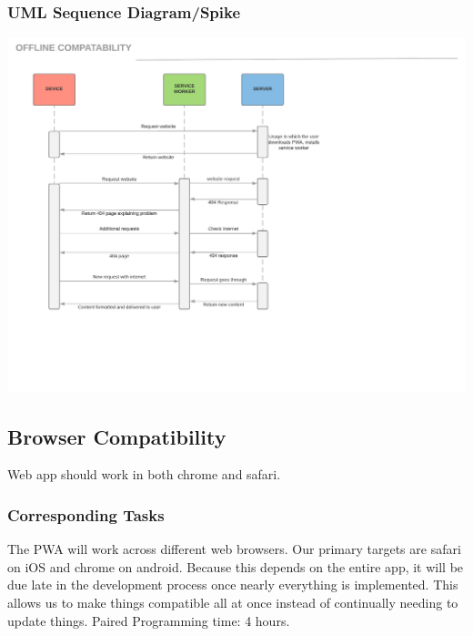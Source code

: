 \documentclass[12pt]{article}
\begin{document}
\subsubsection{UML Sequence Diagram/Spike}
\includegraphics[scale=0.5]{img/10.png}\linebreak

\subsection{Browser Compatibility}
Web app should work in both chrome and safari.
\subsubsection{Corresponding Tasks}
	The PWA will work across different web browsers.  Our primary targets are safari on iOS and chrome on android.  Because this depends on the entire app, it will be due late in the development process once nearly everything is implemented.  This allows us to make things compatible all at once instead of continually needing to update things.  Paired Programming time: 4 hours.
\end{document}
